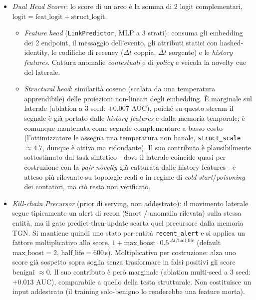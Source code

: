 \begin{itemize}
    \item \textit{Dual Head Scorer}: lo score di un arco è la somma di 2 logit complementari, \texttt{$\text{logit} = \text{feat\_logit} + \text{struct\_logit}$}.
    \begin{itemize}
        \item \textit{Feature head} (\texttt{LinkPredictor}, MLP a 3 strati): consuma gli embedding dei 2 endpoint, il messaggio dell'evento, gli attributi statici con hashed-identity, le codifiche di recency ($\Delta t$ coppia, $\Delta t$ sorgente) e le \textit{history features}. Cattura anomalie \textit{contestuali} e di \textit{policy} e veicola la novelty cue del laterale.
        \item \textit{Structural head}: similarità coseno (scalata da una temperatura apprendibile) delle proiezioni non-lineari degli embedding. È marginale sul laterale (ablation a 3 seed: $+0.007$ AUC), poiché su questo stream il segnale è già portato dalle \textit{history features} e dalla memoria temporale; è comunque mantenuta come segnale complementare a basso costo (l'ottimizzatore le assegna una temperatura non banale, \texttt{struct\_scale}$\approx 4.7$, dunque è attiva ma ridondante). Il suo contributo è plausibilmente sottostimato dal task sintetico - dove il laterale coincide quasi per costruzione con la \textit{pair-novelty} già catturata dalle history features - e atteso più rilevante su topologie reali o in regime di \textit{cold-start}/\textit{poisoning} dei contatori, ma ciò resta non verificato.
    \end{itemize}
    \item \textit{Kill-chain Precursor} (prior di serving, non addestrato): il movimento laterale segue tipicamente un alert di recon (Snort / anomalia rilevata) sulla stessa entità, ma il gate predict-then-update scarta quel precursore dalla memoria TGN. Si mantiene quindi uno stato per-entità \texttt{recent\_alert} e si applica un fattore moltiplicativo allo score, $1 + \text{max\_boost}\cdot 0.5^{\,\Delta t / \text{half\_life}}$ (default $\text{max\_boost}{=}2$, $\text{half\_life}{=}600$\,s). Moltiplicativo per costruzione: alza uno score già sospetto sopra soglia senza trasformare in falsi positivi gli score benigni $\approx 0$. Il suo contributo è però marginale (ablation multi-seed a 3 seed: $+0.013$ AUC), comparabile a quello della testa strutturale. Non costituisce un input addestrato (il training solo-benigno lo renderebbe una feature morta).
\end{itemize}

